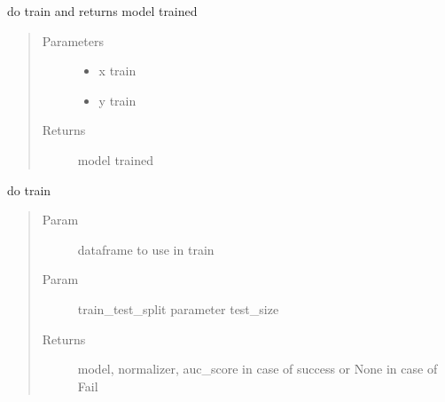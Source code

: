 \documentclass[letterpaper,10pt,english]{sphinxmanual}
\begin{document}

\begin{fulllineitems}
\label{\detokenize{algorithms:algorithms.isg.isg_trainer.do_train}}
\sphinxAtStartPar
do train and returns model trained
\begin{quote}\begin{description}
\item[{Parameters}] \leavevmode\begin{itemize}
\item {} 
\sphinxAtStartPar
{} \textendash{} x train

\item {} 
\sphinxAtStartPar
{} \textendash{} y train

\end{itemize}

\item[{Returns}] \leavevmode
\sphinxAtStartPar
model trained

\end{description}\end{quote}

\end{fulllineitems}


\begin{fulllineitems}
\label{\detokenize{algorithms:algorithms.isg.isg_trainer.train}}
\sphinxAtStartPar
do train
\begin{quote}\begin{description}
\item[{Param}] \leavevmode
\sphinxAtStartPar
dataframe to use in train

\item[{Param}] \leavevmode
\sphinxAtStartPar
train\_test\_split parameter test\_size

\item[{Returns}] \leavevmode
\sphinxAtStartPar
model, normalizer, auc\_score in case of success or None in case of Fail

\end{description}\end{quote}

\end{fulllineitems}
\end{document}
